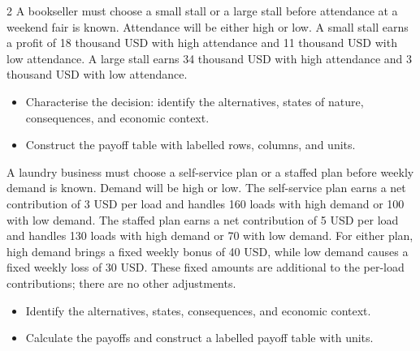 \begin{multicols}{2}\raggedcolumns
{}
A bookseller must choose a small stall or a large stall before attendance at a weekend fair is known. Attendance will be either high or low. A small stall earns a profit of 18 thousand USD with high attendance and 11 thousand USD with low attendance. A large stall earns 34 thousand USD with high attendance and 3 thousand USD with low attendance.
\begin{itemize}
\item[\textbf{(C1)}] Characterise the decision: identify the alternatives, states of nature, consequences, and economic context. 
\item[\textbf{(C2)}] Construct the payoff table with labelled rows, columns, and units. 
\end{itemize}

\columnbreak
{}
A laundry business must choose a self-service plan or a staffed plan before weekly demand is known. Demand will be high or low. The self-service plan earns a net contribution of 3 USD per load and handles 160 loads with high demand or 100 with low demand. The staffed plan earns a net contribution of 5 USD per load and handles 130 loads with high demand or 70 with low demand. For either plan, high demand brings a fixed weekly bonus of 40 USD, while low demand causes a fixed weekly loss of 30 USD. These fixed amounts are additional to the per-load contributions; there are no other adjustments.
\begin{itemize}
\item[\textbf{(C1)}] Identify the alternatives, states, consequences, and economic context. 
\item[\textbf{(C2)}] Calculate the payoffs and construct a labelled payoff table with units. 
\end{itemize}
\end{multicols}
\clearpage
